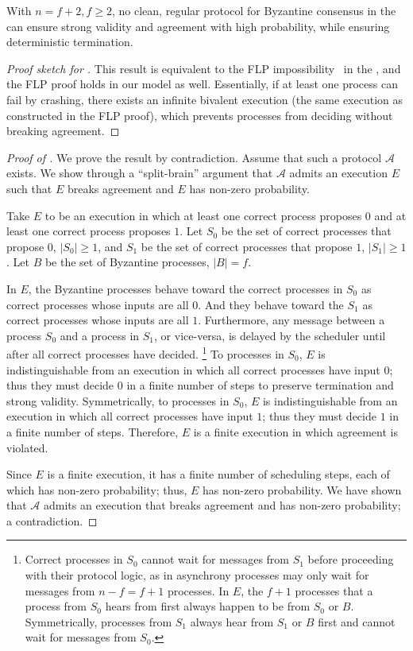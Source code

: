\begin{theorem}\label{thm:f+2}
    With $n=f+2, f\geq 2$, no clean, regular protocol for Byzantine consensus in the \model can ensure strong validity and agreement with high probability, while ensuring deterministic termination.
\end{theorem}

\begin{proof}[Proof sketch for ]
    This result is equivalent to the FLP impossibility~\cite{FLP} in the \model, and the FLP proof holds in our model as well. Essentially, if at least one process can fail by crashing, there exists an infinite bivalent execution (the same execution as constructed in the FLP proof), which prevents processes from deciding without breaking agreement.
\end{proof}

\begin{proof}[Proof of ]
    We prove the result by contradiction. Assume that such a protocol $\mathcal{A}$ exists. We show through a ``split-brain'' argument that $\mathcal{A}$ admits an execution $E$ such that $E$ breaks agreement and $E$ has non-zero probability. 

    Take $E$ to be an execution in which at least one correct process proposes $0$ and at least one correct process proposes $1$. Let $S_0$ be the set of correct processes that propose $0$, $|S_0| \geq 1$, and $S_1$ be the set of correct processes that propose $1$, $|S_1| \geq 1$. Let $B$ be the set of Byzantine processes, $|B|=f$.

    In $E$, the Byzantine processes behave toward the correct processes in $S_0$ as correct processes whose inputs are all $0$. And they behave toward the $S_1$ as correct processes whose inputs are all $1$. Furthermore, any message between a process $S_0$ and a process in $S_1$, or vice-versa, is delayed by the scheduler until after all correct processes have decided.
    \footnote{Correct processes in $S_0$ cannot wait for messages from $S_1$ before proceeding with their protocol logic, as in asynchrony processes may only wait for messages from $n-f = f+1$ processes. In $E$, the $f+1$ processes that a process from $S_0$ hears from first always happen to be from $S_0$ or $B$. Symmetrically, processes from $S_1$ always hear from $S_1$ or $B$ first and cannot wait for messages from $S_0$.} 
    To processes in $S_0$, $E$ is indistinguishable from an execution in which all correct processes have input $0$; thus they must decide $0$ in a finite number of steps to preserve termination and strong validity. Symmetrically, to processes in $S_0$, $E$ is indistinguishable from an execution in which all correct processes have input $1$; thus they must decide $1$ in a finite number of steps. Therefore, $E$ is a finite execution in which agreement is violated. 

    Since $E$ is a finite execution, it has a finite number of scheduling steps, each of which has non-zero probability; thus, $E$ has non-zero probability. We have shown that $\mathcal{A}$ admits an execution that  breaks agreement and has non-zero probability; a contradiction.
\end{proof}

